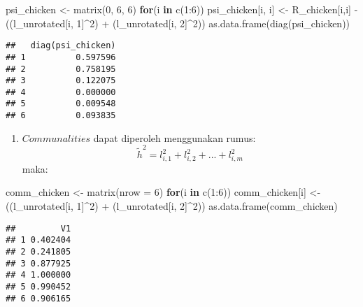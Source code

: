 \documentclass[
]{article}
\newenvironment{Shaded}{\begin{snugshade}}{\end{snugshade}}
\newcommand{\AttributeTok}[1]{\textcolor[rgb]{0.77,0.63,0.00}{#1}}
\newcommand{\ControlFlowTok}[1]{\textcolor[rgb]{0.13,0.29,0.53}{\textbf{#1}}}
\newcommand{\DecValTok}[1]{\textcolor[rgb]{0.00,0.00,0.81}{#1}}
\newcommand{\FunctionTok}[1]{\textcolor[rgb]{0.00,0.00,0.00}{#1}}
\newcommand{\NormalTok}[1]{#1}
\newcommand{\OtherTok}[1]{\textcolor[rgb]{0.56,0.35,0.01}{#1}}
\newcommand{\SpecialCharTok}[1]{\textcolor[rgb]{0.00,0.00,0.00}{#1}}
\providecommand{\tightlist}{%
  \setlength{\itemsep}{0pt}\setlength{\parskip}{0pt}}
\begin{document}
\begin{Shaded}
\begin{Highlighting}[]
\NormalTok{psi\_chicken }\OtherTok{\textless{}{-}} \FunctionTok{matrix}\NormalTok{(}\DecValTok{0}\NormalTok{, }\DecValTok{6}\NormalTok{, }\DecValTok{6}\NormalTok{)}
\ControlFlowTok{for}\NormalTok{(i }\ControlFlowTok{in} \FunctionTok{c}\NormalTok{(}\DecValTok{1}\SpecialCharTok{:}\DecValTok{6}\NormalTok{))}
\NormalTok{  psi\_chicken[i, i] }\OtherTok{\textless{}{-}}\NormalTok{ R\_chicken[i,i] }\SpecialCharTok{{-}}\NormalTok{ ((l\_unrotated[i, }\DecValTok{1}\NormalTok{]}\SpecialCharTok{\^{}}\DecValTok{2}\NormalTok{) }\SpecialCharTok{+}\NormalTok{ (l\_unrotated[i, }\DecValTok{2}\NormalTok{]}\SpecialCharTok{\^{}}\DecValTok{2}\NormalTok{))}
\FunctionTok{as.data.frame}\NormalTok{(}\FunctionTok{diag}\NormalTok{(psi\_chicken))}
\end{Highlighting}
\end{Shaded}

\begin{verbatim}
##   diag(psi_chicken)
## 1          0.597596
## 2          0.758195
## 3          0.122075
## 4          0.000000
## 5          0.009548
## 6          0.093835
\end{verbatim}

\begin{enumerate}
\def\labelenumi{\alph{enumi}.}
\setcounter{enumi}{1}
\tightlist
\item
  \(Communalities\) dapat diperoleh menggunakan rumus:
  \[\tilde{h}^2 = l_{i,1}^2 + l_{i,2}^2 + ... +l_{i,m}^2\] maka:
\end{enumerate}

\begin{Shaded}
\begin{Highlighting}[]
\NormalTok{comm\_chicken }\OtherTok{\textless{}{-}} \FunctionTok{matrix}\NormalTok{(}\AttributeTok{nrow =} \DecValTok{6}\NormalTok{)}
\ControlFlowTok{for}\NormalTok{(i }\ControlFlowTok{in} \FunctionTok{c}\NormalTok{(}\DecValTok{1}\SpecialCharTok{:}\DecValTok{6}\NormalTok{))}
\NormalTok{  comm\_chicken[i] }\OtherTok{\textless{}{-}}\NormalTok{ ((l\_unrotated[i, }\DecValTok{1}\NormalTok{]}\SpecialCharTok{\^{}}\DecValTok{2}\NormalTok{) }\SpecialCharTok{+}\NormalTok{ (l\_unrotated[i, }\DecValTok{2}\NormalTok{]}\SpecialCharTok{\^{}}\DecValTok{2}\NormalTok{))}
\FunctionTok{as.data.frame}\NormalTok{(comm\_chicken)}
\end{Highlighting}
\end{Shaded}

\begin{verbatim}
##         V1
## 1 0.402404
## 2 0.241805
## 3 0.877925
## 4 1.000000
## 5 0.990452
## 6 0.906165
\end{verbatim}
\end{document}
